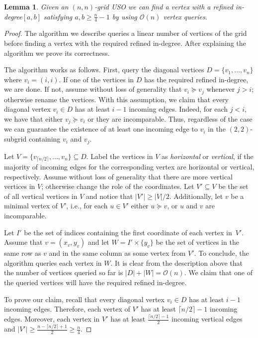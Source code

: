 \documentclass[a4paper,10pt]{article}
\newtheorem{lemma}{Lemma}
\newcommand{\indegree}{refined in-degree\xspace}
\begin{document}
\begin{lemma}
 Given an $(n, n)$-grid USO we can find a vertex with a \indegree $[a,b]$ satisfying $a, b \geq \frac{n}{4} - 1$ by using $\mathcal{O}(n)$ vertex queries.
\end{lemma}

\begin{proof}
The algorithm we describe queries a linear number of vertices of the grid before finding a vertex with the required \indegree. 
After explaining the algorithm we prove its correctness.
  
The algorithm works as follows. First, query the diagonal vertices $D = \{v_1,\ldots, v_n\}$ where $v_i = (i,i)$. If one of the vertices in $D$ has the required \indegree, we are done. If not, assume without loss of generality that $v_i \succeq v_j$ whenever $j > i$; otherwise rename the vertices. 
With this assumption, we claim that every diagonal vertex $v_i \in D$ has at least $i - 1$ incoming edges. Indeed, for each $j < i$, we have that either $v_j \succeq v_i$ or they are incomparable. Thus, regardless of the case we can guarantee the existence of at least one incoming edge to $v_i$ in the $(2, 2)$-subgrid containing $v_i$ and $v_j$. 

Let $V = \{v_{\lceil n/2 \rceil},\ldots,v_n\} \subseteq D$.
Label the vertices in $V$ as \emph{horizontal}  or \emph{vertical}, if the majority of incoming edges for the corresponding vertex are horizontal  or vertical, respectively. 
Assume without loss of generality that there are more vertical vertices in $V$; otherwise change the role of the coordinates. 
Let $V' \subseteq V$ be the set of all vertical vertices in $V$ and notice that $|V'| \geq |V|/2$.
 Additionally, let $v$ be a minimal vertex of $V'$, i.e., for each $u\in V'$ either $u\succeq v$, or $u$ and $v$ are incomparable. 

Let $I'$ be the set of indices containing the first coordinate of each vertex in~$V'$.
Assume that $v = (x_v, y_v)$ and let $W = I'\times \{y_v\}$ be the set of vertices in the same row as $v$ and in the same column as some vertex from $V'$.
To conclude, the algorithm queries each vertex in $W$.
It is clear from the description above that the number of vertices queried so far is $|D| + |W| = \mathcal{O}(n)$. 
We claim that one of the queried vertices will have the required \indegree.

To prove our claim, recall that every diagonal vertex $v_i \in D$ has at least $i - 1$ incoming edges.  
Therefore, each vertex of $V'$ has at least $\lceil n/2 \rceil - 1$ incoming edges. 
Moreover, each vertex in $V'$ has at least $\frac{\lceil n/2\rceil-1}{2}$ incoming vertical edges and $|V'| \geq \frac{n-\lceil n/2\rceil + 1}{2} \geq \frac{n}{4}$. 


\end{proof}
\end{document}
